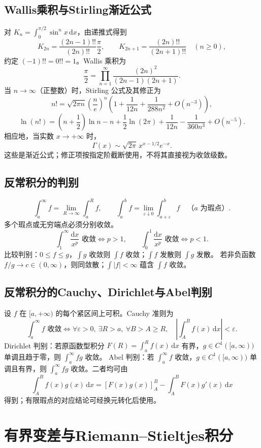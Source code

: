 \documentclass[../main.tex]{subfiles}
\begin{document}
\subsection{Wallis乘积与Stirling渐近公式}
对 $K_n=\int_0^{\pi/2}\sin^nx\,\mathrm dx$，由递推式得到
\[
K_{2n}=\frac{(2n-1)!!}{(2n)!!}\frac\pi2,\qquad
K_{2n+1}=\frac{(2n)!!}{(2n+1)!!}\quad(n\ge0),
\]
约定 $(-1)!!=0!!=1$。Wallis 乘积为
\[
\frac\pi2=\prod_{n=1}^\infty\frac{(2n)^2}{(2n-1)(2n+1)}.
\]
当 $n\to\infty$（正整数）时，Stirling 公式及其修正为
\[
n!=\sqrt{2\pi n}\left(\frac ne\right)^n
\left(1+\frac1{12n}+\frac1{288n^2}+O(n^{-3})\right),
\]
\[
\ln(n!)=\left(n+\frac12\right)\ln n-n+\frac12\ln(2\pi)
+\frac1{12n}-\frac1{360n^3}+O(n^{-5}).
\]
相应地，当实数 $x\to+\infty$ 时，
\[
\Gamma(x)\sim\sqrt{2\pi}\,x^{x-1/2}e^{-x}.
\]
这些是渐近公式；修正项按指定阶截断使用，不将其直接视为收敛级数。
\subsection{反常积分的判别}
\[
\int_a^\infty f=\lim_{R\to\infty}\int_a^R f,\qquad
\int_a^b f=\lim_{\varepsilon\downarrow0}\int_{a+\varepsilon}^b f
\quad\text{（$a$ 为瑕点）}.
\]
多个瑕点或无穷端点必须分别收敛。
\[
\int_1^\infty\frac{\mathrm dx}{x^p}\text{ 收敛}\iff p>1,\qquad
\int_0^1\frac{\mathrm dx}{x^p}\text{ 收敛}\iff p<1.
\]
比较判别：$0\le f\le g$，$\int g$ 收敛则 $\int f$ 收敛；$\int f$ 发散则 $\int g$ 发散。
若非负函数 $f/g\to c\in(0,\infty)$，则同敛散；$\int|f|<\infty$ 蕴含 $\int f$ 收敛。
\subsection{反常积分的Cauchy、Dirichlet与Abel判别}
设 $f$ 在 $[a,+\infty)$ 的每个紧区间上可积。Cauchy 准则为
\[
\int_a^\infty f\text{ 收敛}\iff
\forall\varepsilon>0,\ \exists R>a,\ \forall B>A\ge R,\quad
\left|\int_A^B f(x)\,\mathrm dx\right|<\varepsilon.
\]
Dirichlet 判别：若原函数型积分 $F(R)=\int_a^Rf(x)\,\mathrm dx$ 有界，$g\in C^1([a,\infty))$ 单调且趋于零，则 $\int_a^\infty fg$ 收敛。
Abel 判别：若 $\int_a^\infty f$ 收敛，$g\in C^1([a,\infty))$ 单调且有界，则 $\int_a^\infty fg$ 收敛。二者均可由
\[
\int_A^B f(x)g(x)\,\mathrm dx
=[F(x)g(x)]_A^B-\int_A^BF(x)g'(x)\,\mathrm dx
\]
得到；有限瑕点的对应结论可经换元转化后使用。
\section{有界变差与Riemann--Stieltjes积分}
\end{document}
